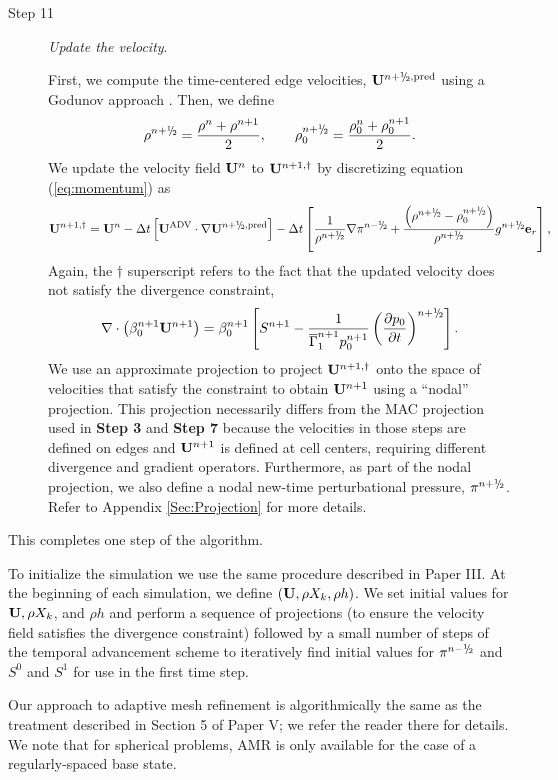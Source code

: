 \begin{description}
\begin{enumerate}
\end{enumerate}


\item[Step 11] {\em Update the velocity}.

First, we compute the time-centered edge velocities, $\Ub^{\nph,\pred}$
using a Godunov approach \citep{XRB_III}. Then, we define
\begin{equation}
\rho^\nph = \frac{\rho^n + \rho^{n+1}}{2}, \qquad \rho_0^\nph = \frac{\rho_0^n + \rho_0^{n+1}}{2}.
\end{equation}
We update the velocity field ${\bf{U}}^n$ to ${\bf{U}}^{n+1,\dagger}$ by discretizing
equation (\ref{eq:momentum}) as
\begin{equation}
\Ub^{n+1,\dagger}
= \Ub^n - \dt \left[\uadvtwo \cdot \nabla \Ub^{\nph,\pred} \right]
 - \dt \left[ \frac{1}{\rho^\nph} \nabla \pi^\nmh + \frac{\left(\rho^\nph-\rho_0^\nph\right)}{\rho^\nph} g^{\nph} \eb_r \right],
\end{equation}
Again, the $\dagger$ superscript refers
to the fact that the updated velocity does not satisfy the divergence constraint,
\begin{equation}
\nabla \cdot \left(\beta_0^{n+1} \Ub^{n+1} \right) = \beta_0^{n+1} \left[ S^{n+1} - \frac{1}{\gammaonebar^{n+1}p_0^{n+1}}\left(\frac{\partial p_0}{\partial t}\right)^{\nph}\right].\label{eq:div3}
\end{equation}
We use an approximate projection to project ${\bf{U}}^{n+1,\dagger}$ onto the space of velocities that satisfy the constraint to obtain ${\bf{U}}^{n+1}$ using a ``nodal'' projection.
This projection necessarily differs from the MAC projection used in
{\bf Step 3} and {\bf Step 7} because the velocities in those steps are defined
on edges and ${\bf{U}}^{n+1}$ is defined at cell centers, requiring different divergence
and gradient operators.
Furthermore, as part of the nodal projection, we also define a nodal new-time perturbational pressure, $\pi^\nph$.
Refer to Appendix \ref{Sec:Projection} for more details.

\end{description}
This completes one step of the algorithm.

To initialize the simulation we use the same procedure described in Paper III.
At the beginning of each simulation, we define $({\bf{U}},\rho X_k,\rho h)$.
We set initial values for ${\bf{U}}, \rho X_k$, and $\rho h$ and perform a sequence of projections 
(to ensure the velocity field satisfies the divergence constraint) 
followed by a small number of steps of the temporal advancement scheme to iteratively 
find initial values for $\pi^{n-\myhalf}$ and $S^0$ and $S^1$ for use in the first time step.

Our approach to adaptive mesh refinement is algorithmically the same as the treatment described in Section 5 of Paper V; we refer the reader there for details.
We note that for spherical problems, AMR is only available for the case of a regularly-spaced base state.
